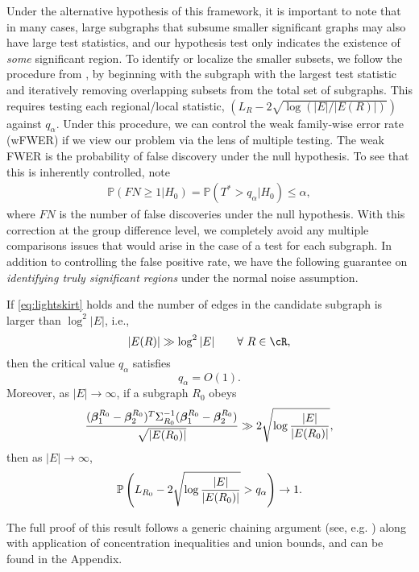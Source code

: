 Under the alternative hypothesis of this framework, it is important to note that in many cases,
large subgraphs that subsume smaller significant graphs may also have large test statistics, and our hypothesis test only indicates the existence of {\em some} significant region. To identify or localize the smaller subsets, we follow the procedure from \cite{jeng2010optimal}, by beginning with the subgraph with the largest test statistic and iteratively removing overlapping subsets from the total set of subgraphs. This requires testing each regional/local statistic, $(L_R - 2\sqrt{\log(|E|/|E(R)|)})$ against $q_\alpha$. Under this procedure, we can control the weak family-wise error rate (wFWER) if we view our problem via the lens of multiple testing. The weak FWER is the probability of false discovery under the null hypothesis. To see that this is inherently controlled, note
\begin{align}
\mathbb{P}(FN \geq 1|H_0) = \mathbb{P}(T^* > q_\alpha|H_0) \leq \alpha, 
\end{align}
where $FN$ is the number of false discoveries under the null hypothesis. With this correction at the group difference level, we completely avoid any multiple comparisons issues that would arise in the case of a test for each subgraph.
%
In addition to controlling the false positive rate, we have the following guarantee on {\em identifying truly significant regions} under the normal noise assumption.
\begin{theorem}
If \eqref{eq:lightskirt} holds and the number of edges in the candidate subgraph is larger than $\log^2 |E|$, i.e.,
\begin{equation}
\label{eq:setsize}
|E(R)|\gg \log^2 |E|\qquad \forall\ R\in\cR,
\end{equation}
then the critical value $q_\alpha$ satisfies
\begin{equation}
\label{eq:criticalvl}
q_\alpha=O(1).
\end{equation}
Moreover, as $|E|\to \infty$, if a subgraph $R_0$ obeys 
\begin{equation}
\label{eq:sigcond}
{(\bm{\beta}_1^{R_0}-\bm{\beta}_2^{R_0})^T\Sigma_{R_0}^{-1}(\bm{\beta}_1^{R_0}-\bm{\beta}_2^{R_0})\over \sqrt{|E({R_0})|}}\gg 2\sqrt{\log{|E|\over |E({R_0})|}},
\end{equation}
then as $|E|\to \infty$,
\begin{equation}
\label{eq:power}
\mathbb{P}\left(L_{R_0}-2\sqrt{\log{|E|\over |E({R_0})|}}>q_\alpha\right)\to 1.
\end{equation}
\label{lm:mainthm}
\end{theorem}
The full proof of this result follows a generic chaining argument (see, e.g. \cite{talagrand2006generic}) along with application of 
concentration inequalities and union bounds, and can be found in the Appendix.


